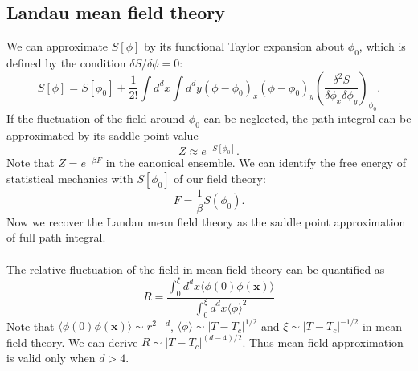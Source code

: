 \subsection{Landau mean field theory}
We can approximate $S[\phi]$ by its functional Taylor expansion about $\phi_0$, which is defined by the condition $\delta S / \delta \phi = 0$:
\[S[\phi] = S[\phi_0] + \frac{1}{2!} \int d^dx \int d^dy (\phi-\phi_0)_x (\phi-\phi_0)_y \left( \frac{\delta^2 S}{\delta \phi_x \delta \phi_y} \right)_{\phi_0}.\]
If the fluctuation of the field around $\phi_0$ can be neglected, the path integral can be approximated by its saddle point value
\[Z \approx e^{-S[\phi_0]}.\]
Note that $Z = e^{-\beta F}$ in the canonical ensemble.
We can identify the free energy of statistical mechanics with $S[\phi_0]$ of our field theory:
\[F = \frac{1}{\beta} S(\phi_0).\]
Now we recover the Landau mean field theory as the saddle point approximation of full path integral.
\\ \\
The relative fluctuation of the field in mean field theory can be quantified as
\begin{equation}
    R = \frac{\int_0^{\xi} d^dx \langle \phi(0)\phi(\bm{x}) \rangle }{\int_0^\xi d^dx \langle \phi \rangle^2} 
\end{equation}
Note that $\langle \phi(0)\phi(\bm{x})\rangle \sim r^{2-d}$, $\langle \phi \rangle \sim |T-T_c|^{1/2}$ and $\xi \sim |T-T_c|^{-1/2}$ in mean field theory.
We can derive $R \sim |T-T_c|^{(d-4)/2}$.
Thus mean field approximation is valid only when $d > 4$. 

